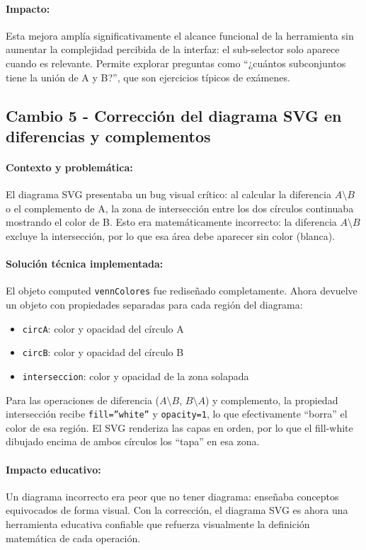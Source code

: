 \documentclass[11pt,a4paper]{article}
\begin{document}
\paragraph{Impacto:}
Esta mejora amplía significativamente el alcance funcional de la herramienta sin aumentar la complejidad percibida de la interfaz: el sub-selector solo aparece cuando es relevante. Permite explorar preguntas como ``¿cuántos subconjuntos tiene la unión de A y B?'', que son ejercicios típicos de exámenes.

\subsection{Cambio 5 - Corrección del diagrama SVG en diferencias y complementos}
\paragraph{Contexto y problemática:}
El diagrama SVG presentaba un bug visual crítico: al calcular la diferencia $A \setminus B$ o el complemento de A, la zona de intersección entre los dos círculos continuaba mostrando el color de B. Esto era matemáticamente incorrecto: la diferencia $A \setminus B$ excluye la intersección, por lo que esa área debe aparecer sin color (blanca).

\paragraph{Solución técnica implementada:}
El objeto computed \texttt{vennColores} fue rediseñado completamente. Ahora devuelve un objeto con propiedades separadas para cada región del diagrama:
\begin{itemize}[noitemsep]
    \item \texttt{circA}: color y opacidad del círculo A
    \item \texttt{circB}: color y opacidad del círculo B
    \item \texttt{interseccion}: color y opacidad de la zona solapada
\end{itemize}
Para las operaciones de diferencia ($A \setminus B$, $B \setminus A$) y complemento, la propiedad intersección recibe \texttt{fill=''white''} y \texttt{opacity=1}, lo que efectivamente ``borra'' el color de esa región. El SVG renderiza las capas en orden, por lo que el fill-white dibujado encima de ambos círculos los ``tapa'' en esa zona.

\paragraph{Impacto educativo:}
Un diagrama incorrecto era peor que no tener diagrama: enseñaba conceptos equivocados de forma visual. Con la corrección, el diagrama SVG es ahora una herramienta educativa confiable que refuerza visualmente la definición matemática de cada operación.
\end{document}
